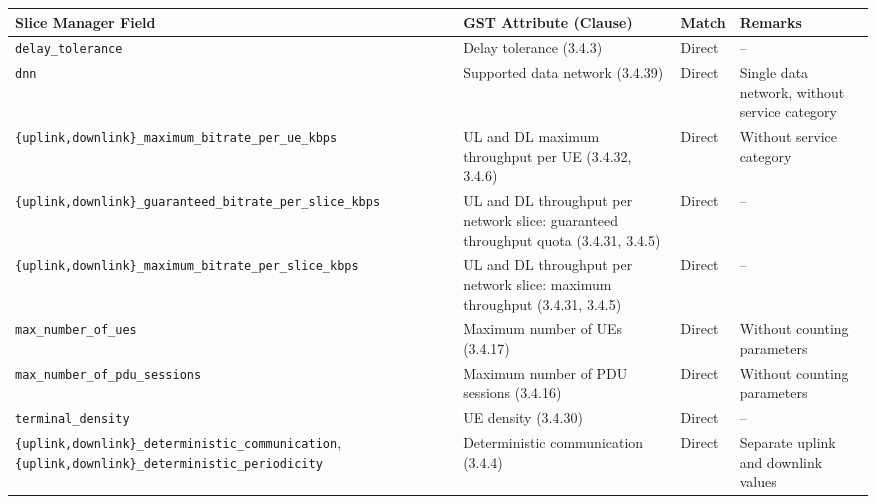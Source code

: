 \begin{table}[htbp]
    \centering
    \small
    \renewcommand\tabularxcolumn[1]{m{#1}}
    \begin{tabularx}{\textwidth}{|
        >{\RaggedRight\arraybackslash}m{}|
        >{\RaggedRight\arraybackslash}X|
        >{\RaggedRight\arraybackslash}m{}|
        >{\RaggedRight\arraybackslash}X|}
        \hline
        \textbf{Slice Manager Field} & \textbf{\acs{GST} Attribute (Clause)} & \textbf{Match} & \textbf{Remarks} \\
        \hline
        \texttt{delay\_tolerance} & Delay tolerance (3.4.3) & Direct & -- \\
        \hline
        \texttt{dnn} & Supported data network (3.4.39) & Direct & Single data network, without service category \\
        \hline
        \texttt{\{uplink,downlink\}\_\allowbreak maximum\_\allowbreak bitrate\_\allowbreak per\_\allowbreak ue\_\allowbreak kbps} & \acs{UL} and \acs{DL} maximum throughput per \acs{UE} (3.4.32, 3.4.6) & Direct & Without service category \\
        \hline
        \texttt{\{uplink,downlink\}\_\allowbreak guaranteed\_\allowbreak bitrate\_\allowbreak per\_\allowbreak slice\_\allowbreak kbps} & \acs{UL} and \acs{DL} throughput per network slice: guaranteed throughput quota (3.4.31, 3.4.5) & Direct & -- \\
        \hline
        \texttt{\{uplink,downlink\}\_\allowbreak maximum\_\allowbreak bitrate\_\allowbreak per\_\allowbreak slice\_\allowbreak kbps} & \acs{UL} and \acs{DL} throughput per network slice: maximum throughput (3.4.31, 3.4.5) & Direct & -- \\
        \hline
        \texttt{max\_\allowbreak number\_\allowbreak of\_\allowbreak ues} & Maximum number of \acsp{UE} (3.4.17) & Direct & Without counting parameters \\
        \hline
        \texttt{max\_\allowbreak number\_\allowbreak of\_\allowbreak pdu\_\allowbreak sessions} & Maximum number of \acs{PDU} sessions (3.4.16) & Direct & Without counting parameters \\
        \hline
        \texttt{terminal\_\allowbreak density} & \acs{UE} density (3.4.30) & Direct & -- \\
        \hline
        \texttt{\{uplink,downlink\}\_\allowbreak deterministic\_\allowbreak communication}, \texttt{\{uplink,downlink\}\_\allowbreak deterministic\_\allowbreak periodicity} & Deterministic communication (3.4.4) & Direct & Separate uplink and downlink values \\

\end{tabularx}
\end{table}
